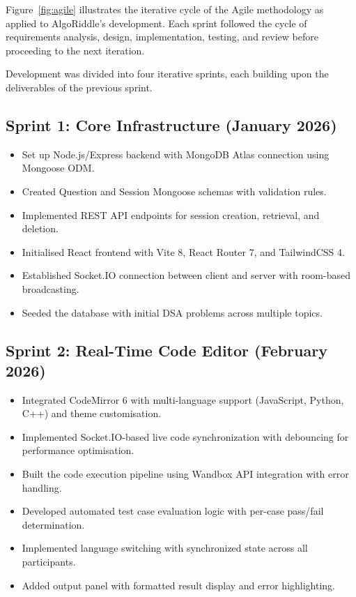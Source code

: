 Figure~\ref{fig:agile} illustrates the iterative cycle of the Agile methodology as applied to AlgoRiddle's development. Each sprint followed the cycle of requirements analysis, design, implementation, testing, and review before proceeding to the next iteration.

Development was divided into four iterative sprints, each building upon the deliverables of the previous sprint.

\subsection{Sprint 1: Core Infrastructure (January 2026)}
\begin{itemize}
    \item Set up Node.js/Express backend with MongoDB Atlas connection using Mongoose ODM.
    \item Created Question and Session Mongoose schemas with validation rules.
    \item Implemented REST API endpoints for session creation, retrieval, and deletion.
    \item Initialised React frontend with Vite 8, React Router 7, and TailwindCSS 4.
    \item Established Socket.IO connection between client and server with room-based broadcasting.
    \item Seeded the database with initial DSA problems across multiple topics.
\end{itemize}

\subsection{Sprint 2: Real-Time Code Editor (February 2026)}
\begin{itemize}
    \item Integrated CodeMirror 6 with multi-language support (JavaScript, Python, C++) and theme customisation.
    \item Implemented Socket.IO-based live code synchronization with debouncing for performance optimisation.
    \item Built the code execution pipeline using Wandbox API integration with error handling.
    \item Developed automated test case evaluation logic with per-case pass/fail determination.
    \item Implemented language switching with synchronized state across all participants.
    \item Added output panel with formatted result display and error highlighting.
\end{itemize}

